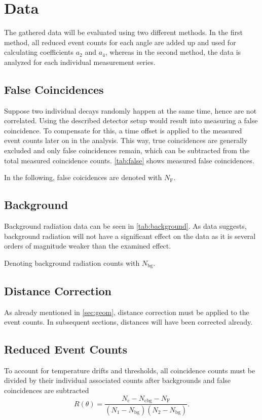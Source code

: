 \chapter{Data}
The gathered data will be evaluated using two different methods.
In the first method, all reduced event counts for each angle are added up and used for calculating coefficients $a_2$ and $a_4$,
whereas in the second method, the data is analyzed for each individual measurement series.

\section{False Coincidences}
Suppose two individual decays randomly happen at the same time, hence are not correlated.
Using the described detector setup would result into measuring a false coincidence.
To compensate for this, a time offset is applied to the measured event counts later on in the analysis.
This way, true coincidences are generally excluded and only false coincidences remain, which can be subtracted from the total measured coincidence counts.
\autoref{tab:false} shows measured false coincidences.

In the following, false coicidences are denoted with $N_\text{F}$.

\section{Background}\label{sec:bg}
Background radiation data can be seen in \autoref{tab:background}.
As data suggests, background radiation will not have a significant effect on the data as it is several orders of magnitude weaker than the examined effect.

Denoting background radiation counts with $N_\text{bg}$.

\section{Distance Correction}
As already mentioned in \autoref{sec:geom}, distance correction must be applied to the event counts.
In subsequent sections, distances will have been corrected already.

\section{Reduced Event Counts}
To account for temperature drifts and thresholds, all coincidence counts must be divided by their individual associated counts after backgrounds and false coincidences are subtracted
\begin{equation}\label{eq:red}
	R(\theta)=\frac{N_\text{c}-N_\text{cbg}-N_\text{F}}{(N_1-N_\text{bg})(N_2-N_\text{bg})}.
\end{equation}

